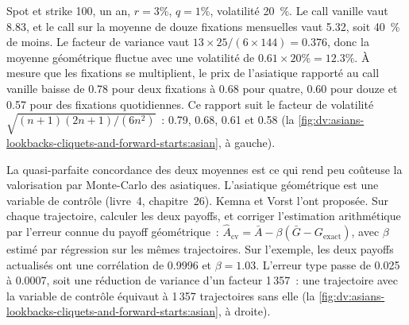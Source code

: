 \begin{example}\label{ex:dv:asians-lookbacks-cliquets-and-forward-starts:asian}
Spot et strike 100, un an, $r=3\%$, $q=1\%$, volatilité 20~\%. Le call vanille vaut 8.83, et le call sur la
moyenne de douze fixations mensuelles vaut 5.32, soit 40~\% de moins. Le facteur de variance vaut $13\times25/(6\times144)=0.376$, donc la
moyenne géométrique fluctue avec une volatilité de $0.61\times20\%=12.3\%$. À mesure que les fixations se multiplient, le prix de l'asiatique rapporté
au call vanille baisse de 0.78 pour deux fixations à 0.68 pour quatre, 0.60 pour douze et 0.57 pour des fixations quotidiennes. Ce rapport suit
le facteur de volatilité $\sqrt{(n+1)(2n+1)/(6n^2)}$~: 0.79, 0.68, 0.61 et 0.58
(la \cref{fig:dv:asians-lookbacks-cliquets-and-forward-starts:asian}, à gauche).
\end{example}

La quasi-parfaite concordance des deux moyennes est ce qui rend peu coûteuse la valorisation par Monte-Carlo des asiatiques. L'asiatique géométrique
est une variable de contrôle (livre~4, chapitre~26). Kemna et Vorst l'ont proposée. Sur chaque trajectoire, calculer les deux payoffs, et
corriger l'estimation arithmétique par l'erreur connue du payoff géométrique~:
$\hat A_{\mathrm{cv}}=\bar A-\beta(\bar G-G_{\mathrm{exact}})$, avec $\beta$ estimé par régression sur les mêmes
trajectoires. Sur l'exemple, les deux payoffs actualisés ont une corrélation de 0.9996 et $\beta=1.03$. L'erreur type passe
de 0.025 à 0.0007, soit une réduction de variance d'un facteur 1\,357~: une trajectoire avec la variable de contrôle équivaut à 1\,357 trajectoires sans
elle (la \cref{fig:dv:asians-lookbacks-cliquets-and-forward-starts:asian}, à droite).

